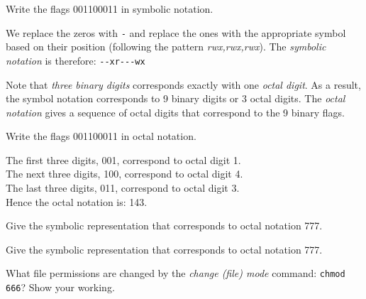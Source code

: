 
\begin{example}
Write the flags 001100011 in symbolic notation.

We replace the zeros with \lstinline{-} and replace the ones with the 
appropriate symbol based on their position 
(following the pattern \textit{rwx,rwx,rwx}). 
The \textit{symbolic notation} is therefore: \lstinline{--xr---wx}

\end{example}

\frmrule


Note that \textit{three binary digits} corresponds exactly with one \textit{octal digit}. 
As a result, the symbol notation corresponds to 9 binary digits or 3 octal digits. 
The \textit{octal notation} gives a sequence of octal digits that correspond to the 
9 binary flags. 

\frmrule

\begin{example}
Write the flags 001100011 in octal notation.

The first three digits, 001, correspond to octal digit 1. \\
The next three digits, 100, correspond to octal digit 4. \\
The last three digits, 011, correspond to octal digit 3. \\
Hence the octal notation is: 143.
\end{example}

\begin{example}
Give the symbolic representation that corresponds to octal notation 777.
\end{example}

\frmrule

\begin{example}
Give the symbolic representation that corresponds to octal notation 777.
\end{example}

\frmrule

\begin{example}
What file permissions are changed by the \textit{change (file) mode} command: \lstinline{chmod 666}? 
Show your working.
\end{example}

\frmrule


